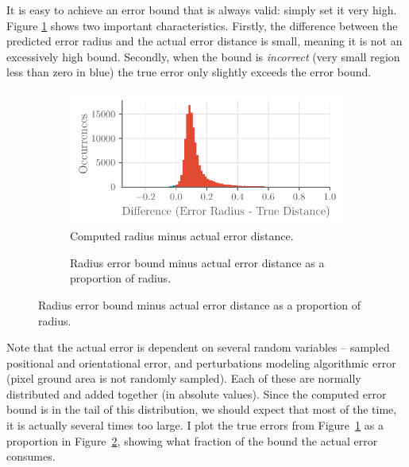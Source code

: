 \documentclass[a4paper,12pt,twoside,openright]{report}
\begin{document}
It is easy to achieve an error bound that is always valid: simply set it very high.
Figure \ref{fig:camera:diff} shows two important characteristics. Firstly, the difference between
the predicted error radius and the actual error distance is small, meaning
it is not an excessively high bound. Secondly, when the bound is \textit{incorrect} (very small region less than zero in blue)
the true error only slightly exceeds the error bound.


\begin{figure}[h!]
\begin{subfigure}[t]{0.45\textwidth}
    \centering
    \includegraphics[width=1\linewidth]{figures/camera/diff_radius_true_error.pdf}
    \caption[Bound Minus True Distance]{Computed radius minus actual error distance.}
    \label{fig:camera:diff}
\end{subfigure}
\begin{subfigure}[t]{0.45\textwidth}
    \centering
    \resizebox{1\linewidth}{!}{}
    \caption[Bound Minus True Distance as a Proportion]{Radius error bound minus actual error distance as a proportion of radius.}
    \label{fig:camera:proportional diff}
\end{subfigure}
\label{fig:camera:diffs}
\end{figure}




Note that the actual error is dependent on several random variables -- sampled positional and orientational
error, and perturbations modeling algorithmic error (pixel ground area is not randomly sampled). Each
of these are normally distributed and added together (in absolute values). Since the computed
error bound is in the tail of this distribution, we should expect that most of the time,
it is actually several times too large. I plot the true errors from Figure~\ref{fig:camera:diff}
as a proportion in Figure~\ref{fig:camera:proportional diff}, showing what fraction of the bound the actual error consumes.
\end{document}
